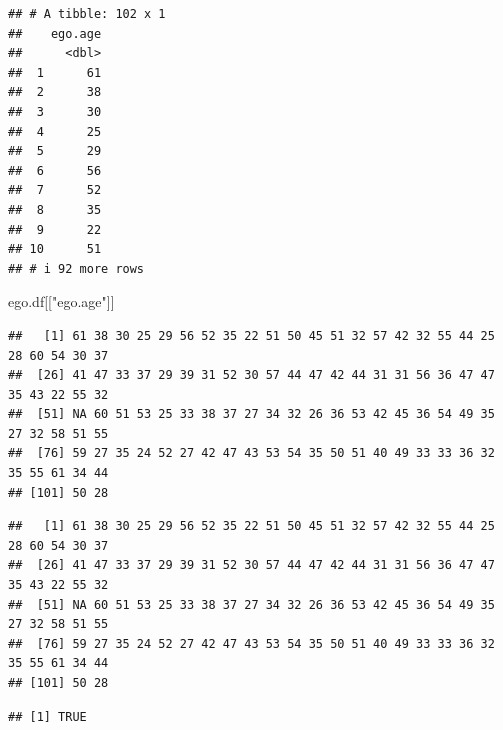 \documentclass[
]{book}
\newenvironment{Shaded}{\begin{snugshade}}{\end{snugshade}}
\newcommand{\CommentTok}[1]{\textcolor[rgb]{0.56,0.35,0.01}{\textit{#1}}}
\newcommand{\DecValTok}[1]{\textcolor[rgb]{0.00,0.00,0.81}{#1}}
\newcommand{\FunctionTok}[1]{\textcolor[rgb]{0.13,0.29,0.53}{\textbf{#1}}}
\newcommand{\NormalTok}[1]{#1}
\newcommand{\SpecialCharTok}[1]{\textcolor[rgb]{0.81,0.36,0.00}{\textbf{#1}}}
\newcommand{\StringTok}[1]{\textcolor[rgb]{0.31,0.60,0.02}{#1}}
\begin{document}
\begin{verbatim}
## # A tibble: 102 x 1
##    ego.age
##      <dbl>
##  1      61
##  2      38
##  3      30
##  4      25
##  5      29
##  6      56
##  7      52
##  8      35
##  9      22
## 10      51
## # i 92 more rows
\end{verbatim}

\begin{Shaded}
\begin{Highlighting}[]
\NormalTok{ego.df[[}\StringTok{"ego.age"}\NormalTok{]]}
\end{Highlighting}
\end{Shaded}

\begin{verbatim}
##   [1] 61 38 30 25 29 56 52 35 22 51 50 45 51 32 57 42 32 55 44 25 28 60 54 30 37
##  [26] 41 47 33 37 29 39 31 52 30 57 44 47 42 44 31 31 56 36 47 47 35 43 22 55 32
##  [51] NA 60 51 53 25 33 38 37 27 34 32 26 36 53 42 45 36 54 49 35 27 32 58 51 55
##  [76] 59 27 35 24 52 27 42 47 43 53 54 35 50 51 40 49 33 33 36 32 35 55 61 34 44
## [101] 50 28
\end{verbatim}

\begin{Shaded}
\begin{Highlighting}[]
\CommentTok{\# The $ notation is very common and concise. It\textquotesingle{}s equivalent to the [[ notation.}
\NormalTok{ego.df}\SpecialCharTok{$}\NormalTok{ego.age}
\end{Highlighting}
\end{Shaded}

\begin{verbatim}
##   [1] 61 38 30 25 29 56 52 35 22 51 50 45 51 32 57 42 32 55 44 25 28 60 54 30 37
##  [26] 41 47 33 37 29 39 31 52 30 57 44 47 42 44 31 31 56 36 47 47 35 43 22 55 32
##  [51] NA 60 51 53 25 33 38 37 27 34 32 26 36 53 42 45 36 54 49 35 27 32 58 51 55
##  [76] 59 27 35 24 52 27 42 47 43 53 54 35 50 51 40 49 33 33 36 32 35 55 61 34 44
## [101] 50 28
\end{verbatim}

\begin{Shaded}
\end{Shaded}

\begin{verbatim}
## [1] TRUE
\end{verbatim}
\end{document}
